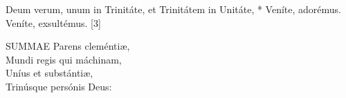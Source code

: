 

 Deum verum, unum in Trinitáte, et Trinitátem in Unitáte, * Veníte, adorémus.  Veníte, exsultémus. [3]


\lettrine[lines=2]{S}{UMMAE} Parens cleméntiæ,\\
Mundi regis qui máchinam,\\
Uníus et substántiæ,\\
Trinúsque persónis Deus:

